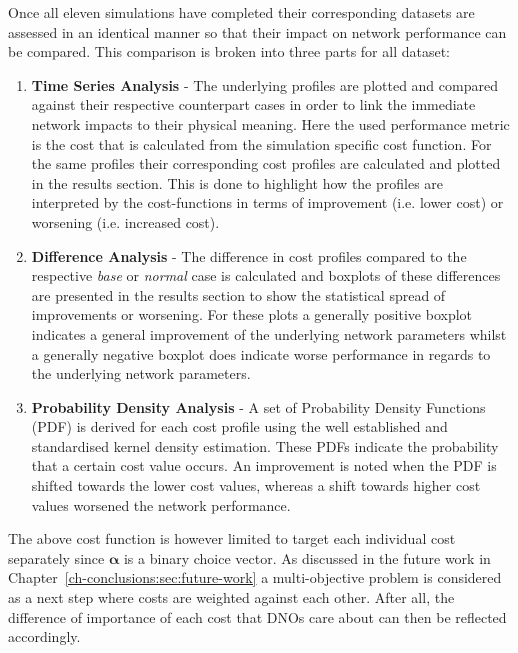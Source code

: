 Once all eleven simulations have completed their corresponding datasets are assessed in an identical manner so that their impact on network performance can be compared.
This comparison is broken into three parts for all dataset:

\begin{enumerate}
	\item \textbf{Time Series Analysis} - 
	The underlying profiles are plotted and compared against their respective counterpart cases in order to link the immediate network impacts to their physical meaning.
	Here the used performance metric is the cost that is calculated from the simulation specific cost function.
	For the same profiles their corresponding cost profiles are calculated and plotted in the results section.
	This is done to highlight how the profiles are interpreted by the cost-functions in terms of improvement (i.e. lower cost) or worsening (i.e. increased cost).
	\item \textbf{Difference Analysis} - 
	The difference in cost profiles compared to the respective \textit{base} or \textit{normal} case is calculated and boxplots of these differences are presented in the results section to show the statistical spread of improvements or worsening.
	For these plots a generally positive boxplot indicates a general improvement of the underlying network parameters whilst a generally negative boxplot does indicate worse performance in regards to the underlying network parameters.
	\item \textbf{Probability Density Analysis} - 
	A set of Probability Density Functions (PDF) is derived for each cost profile using the well established and standardised kernel density estimation.
	These PDFs indicate the probability that a certain cost value occurs.
	An improvement is noted when the PDF is shifted towards the lower cost values, whereas a shift towards higher cost values worsened the network performance.
\end{enumerate}

The above cost function is however limited to target each individual cost separately since $\boldsymbol{\alpha}$ is a binary choice vector.
As discussed in the future work in Chapter~\ref{ch-conclusions:sec:future-work} a multi-objective problem is considered as a next step where costs are weighted against each other.
After all, the difference of importance of each cost that DNOs care about can then be reflected accordingly.
